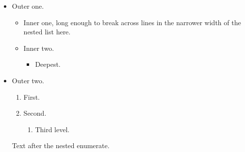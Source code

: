 \documentclass{beamer}
\begin{document}
\begin{frame}
\begin{itemize}
\item Outer one.
\begin{itemize}
\item Inner one, long enough to break across lines in the narrower width of the nested list here.
\item Inner two.
\begin{itemize}
\item Deepest.
\end{itemize}
\end{itemize}
\item Outer two.
\begin{enumerate}
\item First.
\item Second.
\begin{enumerate}
\item Third level.
\end{enumerate}
\end{enumerate}
Text after the nested enumerate.
\end{itemize}
\end{frame}
\end{document}
